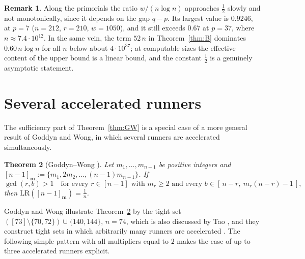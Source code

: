 \documentclass[11pt]{article}
\newtheorem{theorem}{Theorem}[section]
\theoremstyle{definition}
\newtheorem{remark}[theorem]{Remark}
\newcommand{\LR}{\mathrm{LR}}
\begin{document}
\begin{remark}
Along the primorials the ratio $w/(n\log n)$ approaches $\frac12$ slowly
and not monotonically, since it depends on the gap $q-p$. Its largest
value is $0.9246$, at $p=7$ ($n=212$, $r=210$, $w=1050$), and it still
exceeds $0.67$ at $p=37$, where $n\approx7.4\cdot10^{12}$. In the same
vein, the term $52\,n$ in Theorem~\ref{thm:B} dominates $0.60\,n\log n$
for all $n$ below about $4\cdot10^{37}$; at computable sizes the
effective content of the upper bound is a linear bound, and the
constant $\frac12$ is a genuinely asymptotic statement.
\end{remark}

\section{Several accelerated runners}\label{sec:multi}

The sufficiency part of Theorem~\ref{thm:GW} is a special case of a more
general result of Goddyn and Wong, in which several runners are
accelerated simultaneously.

\begin{theorem}[Goddyn--Wong {\cite[Thm.~3.1]{GoddynWong2006}}]\label{thm:gwmulti}
Let $m_1,\dots,m_{n-1}$ be positive integers and
$[n-1]_{\mathbf m}:=\{m_1,2m_2,\dots,(n-1)m_{n-1}\}$. If
\begin{equation}\label{eq:gwmulti}
\gcd(r,b)>1\quad\text{for every } r\in[n-1] \text{ with } m_r\ge2
\text{ and every } b\in[\,n-r,\ m_r(n-r)-1\,],
\end{equation}
then $\LR([n-1]_{\mathbf m})=\frac1n$.
\end{theorem}

Goddyn and Wong illustrate Theorem~\ref{thm:gwmulti} by the tight set
$([73]\setminus\{70,72\})\cup\{140,144\}$, $n=74$, which is also
discussed by Tao \cite{Tao2018}, and they construct tight sets in which
arbitrarily many runners are accelerated \cite[Sec.~3]{GoddynWong2006}.
The following simple pattern with all multipliers equal to $2$ makes
the case of up to three accelerated runners explicit.
\end{document}
